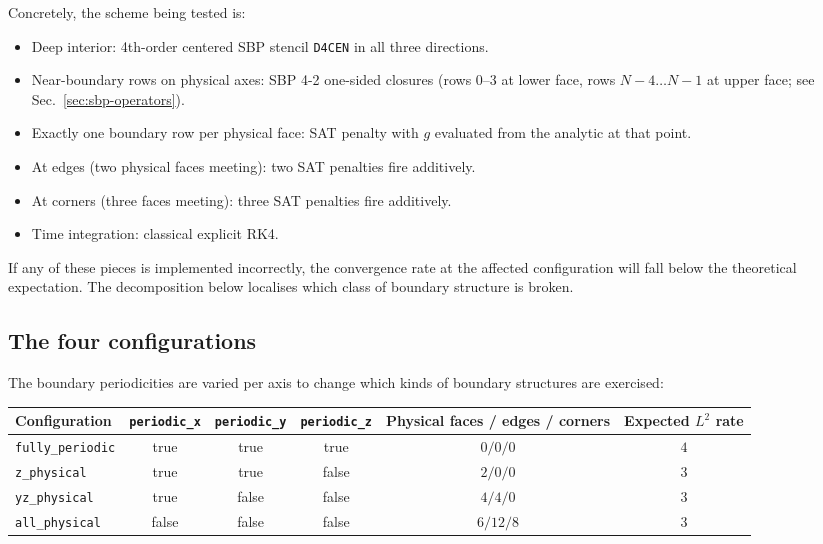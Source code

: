 \documentclass[11pt]{article}
\begin{document}
Concretely, the scheme being tested is:

\begin{itemize}
  \item Deep interior: 4th-order centered SBP stencil
    \texttt{D4CEN} in all three directions.
  \item Near-boundary rows on physical axes: SBP 4-2 one-sided
    closures (rows 0--3 at lower face, rows $N-4 \ldots N-1$ at
    upper face; see Sec.~\ref{sec:sbp-operators}).
  \item Exactly one boundary row per physical face: SAT penalty
    with $g$ evaluated from the analytic at that point.
  \item At edges (two physical faces meeting): two SAT penalties
    fire additively.
  \item At corners (three faces meeting): three SAT penalties
    fire additively.
  \item Time integration: classical explicit RK4.
\end{itemize}

If any of these pieces is implemented incorrectly, the convergence
rate at the affected configuration will fall below the theoretical
expectation. The decomposition below localises which class of
boundary structure is broken.

\subsection{The four configurations}

The boundary periodicities are varied per axis to change which
kinds of boundary structures are exercised:

\begin{center}
\begin{tabular}{lccccc}
\toprule
Configuration     & \texttt{periodic\_x} & \texttt{periodic\_y} & \texttt{periodic\_z}
                  & Physical faces / edges / corners & Expected $L^2$ rate \\
\midrule
\texttt{fully\_periodic} & true  & true  & true  & $0 / 0 / 0$   & $4$ \\
\texttt{z\_physical}     & true  & true  & false & $2 / 0 / 0$   & $3$ \\
\texttt{yz\_physical}    & true  & false & false & $4 / 4 / 0$   & $3$ \\
\texttt{all\_physical}   & false & false & false & $6 / 12 / 8$  & $3$ \\
\bottomrule
\end{tabular}
\end{center}
\end{document}
